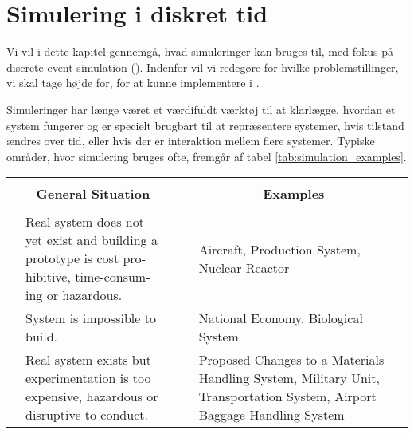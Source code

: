 \chapter{Simulering i diskret tid}
\label{chap:des}
Vi vil i dette kapitel gennemgå, hvad simuleringer kan bruges til, med fokus på discrete event simulation (\des). Indenfor \des vil vi redegøre for hvilke problemstillinger, vi skal tage højde for, for at kunne implementere \des i \pycsp. 

Simuleringer har længe været et værdifuldt værktøj til at klarlægge, hvordan et system fungerer og er specielt brugbart til at repræsentere systemer, hvis 
tilstand ændres over tid, eller hvis der er interaktion mellem flere systemer. Typiske områder, hvor simulering bruges ofte, fremgår af tabel \ref{tab:simulation_examples}. 

\begin{table}[ht]
  \begin{otherlanguage}{english} 	
  \begin{tabularx}{\textwidth}{|p{15pt}Xp{15pt}|p{15pt}Xp{15pt}|}
  \hline  
  &&&&&\\
  \multicolumn{3}{|c|}{\textbf{General Situation}}&\multicolumn{3}{c|}{\textbf{Examples}} \\
  &&&&&\\  
  \hline
  & \vspace{5pt}Real system does not yet exist and building a prototype is cost prohibitive, time-consuming or hazardous. \vspace{5pt}& & & \vspace{5pt}Aircraft, Production System, Nuclear Reactor \vspace{5pt}& \\
  \hline  
  & \vspace{5pt}System is impossible to build.\vspace{5pt} & & & \vspace{3pt}National Economy, Biological System\vspace{5pt} &\\
  \hline
  & \vspace{5pt}Real system exists but experimentation is too expensive, hazardous or disruptive to conduct.\vspace{5pt} & & & \vspace{5pt}Proposed Changes to a Materials Handling System, Military Unit, Transportation System, Airport Baggage Handling System\vspace{5pt} & \\
  \hline

\end{tabularx}
\end{otherlanguage}
\end{table}
